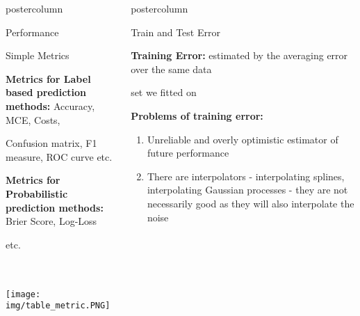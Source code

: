 \documentclass{beamer}
\newlength{\columnheight} %
\begin{document}
\begin{frame}[fragile]{}
\begin{columns}
\begin{column}{.31\textwidth}
\begin{beamercolorbox}[center]{postercolumn}
\begin{minipage}{.98\textwidth}
{\begin{myblock}{Performance}
					\end{myblock}
					\begin{myblock}{Simple Metrics}
					\begin{codebox}
							\textbf{Metrics for Label based prediction methods: }Accuracy, MCE, Costs,
						\end{codebox}
						\begin{codebox}
							 Confusion matrix, F1 measure, ROC curve  etc.
						\end{codebox}
						\hspace*{1ex}
						\begin{codebox}
						\textbf{Metrics for Probabilistic prediction methods: }Brier Score, Log-Loss 
                        \end{codebox}
                        \begin{codebox}
						etc. 
                        \end{codebox}
                        \\
                       \\ \texttt{[image: img/table\_metric.PNG]}
						\\
					\end{myblock}\vfill
				}
			\end{minipage}
		\end{beamercolorbox}
	\end{column}
	\begin{column}{.31\textwidth}
		\begin{beamercolorbox}[center]{postercolumn}
			\begin{minipage}{.98\textwidth}
				\parbox[t][\columnheight]{\textwidth}{
						\begin{myblock}{Train and Test Error}
						\begin{codebox}
							 \textbf{Training Error: }estimated by the averaging error over the same data
						\end{codebox}
						\begin{codebox}
							  set we fitted on
						\end{codebox}
						\hspace*{1ex}\textbf{Problems of training error: }
						\begin{enumerate}
                        \item Unreliable and overly optimistic estimator of future performance
                        \item There are interpolators - interpolating splines, interpolating Gaussian processes - they are not necessarily good as they will also interpolate the noise

\end{enumerate}
\end{myblock}}
\end{minipage}
\end{beamercolorbox}
\end{column}
\end{columns}
\end{frame}
\end{document}
